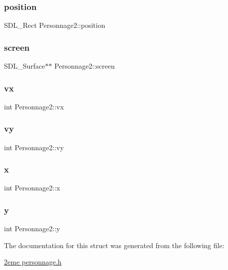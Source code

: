 \subsubsection{\texorpdfstring{position}{position}}
{\footnotesize\ttfamily S\+D\+L\+\_\+\+Rect Personnage2\+::position}

\mbox{\label{structPersonnage2_a9ba0907380a892c9bc00b01cab744baf}} 
\subsubsection{\texorpdfstring{screen}{screen}}
{\footnotesize\ttfamily S\+D\+L\+\_\+\+Surface$\ast$$\ast$ Personnage2\+::screen}

\mbox{\label{structPersonnage2_aaf15cd6e8f9e8f75fcf079b8708f8ca3}} 
\subsubsection{\texorpdfstring{vx}{vx}}
{\footnotesize\ttfamily int Personnage2\+::vx}

\mbox{\label{structPersonnage2_ab90fadbadf36db5de02082c7a2ee1aba}} 
\subsubsection{\texorpdfstring{vy}{vy}}
{\footnotesize\ttfamily int Personnage2\+::vy}

\mbox{\label{structPersonnage2_ae1441c9154226c8f192692a60640ea6c}} 
\subsubsection{\texorpdfstring{x}{x}}
{\footnotesize\ttfamily int Personnage2\+::x}

\mbox{\label{structPersonnage2_ac955392c8e030015e46517244e5987bd}} 
\subsubsection{\texorpdfstring{y}{y}}
{\footnotesize\ttfamily int Personnage2\+::y}



The documentation for this struct was generated from the following file\+:\begin{DoxyCompactItemize}
\item 
\hyperlink{2eme_01personnage_8h}{2eme personnage.\+h}\end{DoxyCompactItemize}
